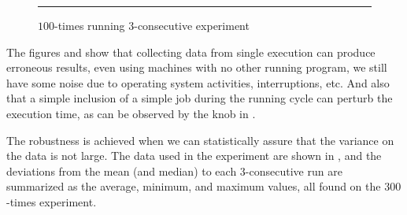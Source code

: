 \begin{figure}
  \centering
  \begin{minipage}[t]{\linewidth}
    \vspace{1em}
    \hrule
    \vspace{1em}
  \end{minipage}
  \caption{$100$-times running $3$-consecutive experiment}
  \label{fig:CProbust}
\end{figure}

The figures  and  show that collecting data from single execution can produce erroneous results, even using machines with no other running program, we still have some noise due to operating system activities, interruptions, etc. And also that a simple inclusion of a simple job during the running cycle can perturb the execution time, as can be observed by the knob in .

The robustness is achieved when we can statistically assure that the variance on the data is not large.
The data used in the experiment are shown in , and the deviations from the mean (and median) to each $3$-consecutive run are summarized as the average, minimum, and maximum values, all found on the $300$-times experiment.

